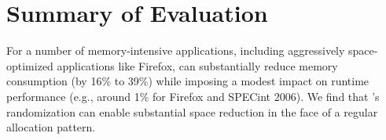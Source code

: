 \section{Summary of Evaluation}
\label{sec:evaluation}
For a number of memory-intensive applications, including aggressively
space-optimized applications like Firefox, \Mesh can substantially
reduce memory consumption (by 16\% to 39\%) while imposing a modest
impact on runtime performance (e.g., around 1\% for Firefox and
SPECint 2006). We find that \Mesh{}'s randomization can enable
substantial space reduction in the face of a regular allocation
pattern.
